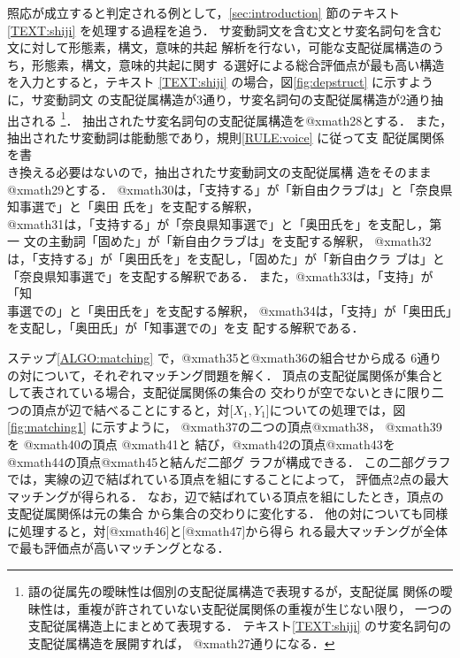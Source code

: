 照応が成立すると判定される例として，\ref{sec:introduction} 節のテキスト
\ref{TEXT:shiji} を処理する過程を追う．
サ変動詞文を含む文とサ変名詞句を含む文に対して形態素，構文，意味的共起
解析を行ない，可能な支配従属構造のうち，形態素，構文，意味的共起に関す
る選好による総合評価点が最も高い構造を入力とすると，テキスト
\ref{TEXT:shiji} の場合，図\ref{fig:depstruct} に示すように，サ変動詞文
の支配従属構造が3通り，サ変名詞句の支配従属構造が2通り抽出される
\footnote{語の従属先の曖昧性は個別の支配従属構造で表現するが，支配従属
関係の曖昧性は，重複が許されていない支配従属関係の重複が生じない限り，
一つの支配従属構造上にまとめて表現する．
テキスト\ref{TEXT:shiji} のサ変名詞句の支配従属構造を展開すれば，
@xmath27通りになる．}．
抽出されたサ変名詞句の支配従属構造を@xmath28とする．\hspace*{0.2mm}
また，\hspace*{0.2mm}抽出されたサ変動詞は能動態であり，\hspace*{0.2mm}規則\ref{RULE:voice} に従って支\hspace*{0.2mm}
配\hspace*{0.2mm}従\hspace*{0.2mm}属\hspace*{0.2mm}関\hspace*{0.2mm}係を書\\き換える必要はないので，抽出されたサ変動詞文の支配従属構
造をそのまま@xmath29とする．
@xmath30は，「支持する」が「新自由クラブは」と「奈良県知事選で」と「奥田
氏を」を支配する解釈，\\
@xmath31は，「支持する」が「奈良県知事選で」と「奥田氏を」を支配し，第一
文の主動詞「固めた」が「新自由クラブは」を支配する解釈，
@xmath32は，「支持する」が「奥田氏を」を支配し，「固めた」が「新自由クラ
ブは」と「奈良県知事選で」を支配する解釈である．
また，@xmath33は，「支持」が「知\\事選での」と「奥田氏を」を支配する解釈，
@xmath34は，「支持」が「奥田氏」を支配し，「奥田氏」が「知事選での」を支
配する解釈である．


ステップ\ref{ALGO:matching} で，@xmath35と@xmath36の組合せから成る
6通りの対について，それぞれマッチング問題を解く．
頂点の支配従属関係が集合として表されている場合，支配従属関係の集合の
交わりが空でないときに限り二つの頂点が辺で結べることにすると，対[$X_1,
Y_1$]についての処理では，図\ref{fig:matching1} に示すように，
@xmath37の二つの頂点@xmath38，
@xmath39を
@xmath40の頂点
@xmath41と
結び，@xmath42の頂点@xmath43を
@xmath44の頂点@xmath45と結んだ二部グ
ラフが構成できる．
この二部グラフでは，実線の辺で結ばれている頂点を組にすることによって，
評価点2点の最大マッチングが得られる．
なお，辺で結ばれている頂点を組にしたとき，頂点の支配従属関係は元の集合
から集合の交わりに変化する．
他の対についても同様に処理すると，対[@xmath46]と[@xmath47]から得ら
れる最大マッチングが全体で最も評価点が高いマッチングとなる．


